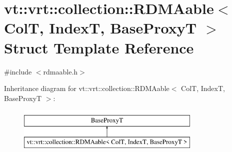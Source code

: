 \hypertarget{structvt_1_1vrt_1_1collection_1_1_r_d_m_aable}{}\section{vt\+:\+:vrt\+:\+:collection\+:\+:R\+D\+M\+Aable$<$ ColT, IndexT, Base\+ProxyT $>$ Struct Template Reference}
\label{structvt_1_1vrt_1_1collection_1_1_r_d_m_aable}


{\ttfamily \#include $<$rdmaable.\+h$>$}

Inheritance diagram for vt\+:\+:vrt\+:\+:collection\+:\+:R\+D\+M\+Aable$<$ ColT, IndexT, Base\+ProxyT $>$\+:\begin{figure}[H]
\begin{center}
\leavevmode
\includegraphics[height=2.000000cm]{structvt_1_1vrt_1_1collection_1_1_r_d_m_aable}
\end{center}
\end{figure}
